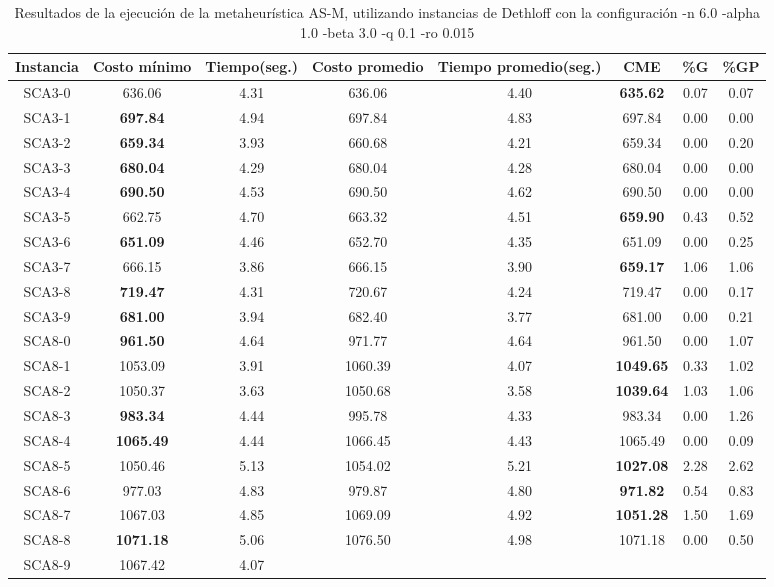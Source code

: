 \begin{table}[h]
\caption{Resultados de la ejecución de la metaheurística AS-M, utilizando instancias de Dethloff con la configuración -n 6.0 -alpha 1.0 -beta 3.0 -q 0.1 -ro 0.015}
\centering
\small
\begin{tabular}{c c c c c c c c}
\hline\hline
Instancia & Costo mínimo & Tiempo(seg.) & Costo promedio & Tiempo promedio(seg.) & CME & \%G & \%GP \\ [0.5ex]
\hline
SCA3-0 & 636.06 & 4.31 & 
636.06 & 4.40 & \bf{635.62} & 
0.07 & 0.07\\SCA3-1 & \bf{697.84} & 4.94 & 
697.84 & 4.83 & 697.84 & 0.00
 & 0.00\\
SCA3-2 & \bf{659.34} & 3.93 & 
660.68 & 4.21 & 659.34 & 0.00
 & 0.20\\SCA3-3 & \bf{680.04} & 4.29 & 
680.04 & 4.28 & 680.04 & 0.00
 & 0.00\\
SCA3-4 & \bf{690.50} & 4.53 & 
690.50 & 4.62 & 690.50 & 0.00
 & 0.00\\
SCA3-5 & 662.75 & 4.70 & 
663.32 & 4.51 & \bf{659.90} & 
0.43 & 0.52\\SCA3-6 & \bf{651.09} & 4.46 & 
652.70 & 4.35 & 651.09 & 0.00
 & 0.25\\SCA3-7 & 666.15 & 3.86 & 
666.15 & 3.90 & \bf{659.17} & 
1.06 & 1.06\\SCA3-8 & \bf{719.47} & 4.31 & 
720.67 & 4.24 & 719.47 & 0.00
 & 0.17\\SCA3-9 & \bf{681.00} & 3.94 & 
682.40 & 3.77 & 681.00 & 0.00
 & 0.21\\SCA8-0 & \bf{961.50} & 4.64 & 
971.77 & 4.64 & 961.50 & 0.00
 & 1.07\\SCA8-1 & 1053.09 & 3.91 & 
1060.39 & 4.07 & \bf{1049.65} & 
0.33 & 1.02\\SCA8-2 & 1050.37 & 3.63 & 
1050.68 & 3.58 & \bf{1039.64} & 
1.03 & 1.06\\SCA8-3 & \bf{983.34} & 4.44 & 
995.78 & 4.33 & 983.34 & 0.00
 & 1.26\\SCA8-4 & \bf{1065.49} & 4.44 & 
1066.45 & 4.43 & 1065.49 & 0.00
 & 0.09\\SCA8-5 & 1050.46 & 5.13 & 
1054.02 & 5.21 & \bf{1027.08} & 
2.28 & 2.62\\SCA8-6 & 977.03 & 4.83 & 
979.87 & 4.80 & \bf{971.82} & 
0.54 & 0.83\\SCA8-7 & 1067.03 & 4.85 & 
1069.09 & 4.92 & \bf{1051.28} & 
1.50 & 1.69\\SCA8-8 & \bf{1071.18} & 5.06 & 
1076.50 & 4.98 & 1071.18 & 0.00
 & 0.50\\SCA8-9 & 1067.42 & 4.07 & 

\end{tabular}
\end{table}
